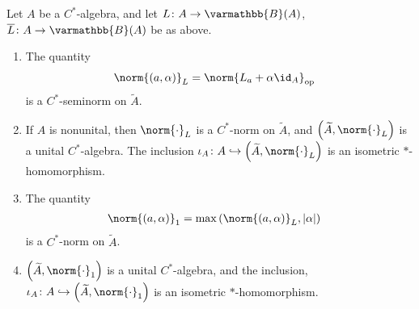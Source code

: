 \documentclass[10pt]{mypackage}
\renewcommand*{\mathbb}[1]{\varmathbb{#1}}
\newcommand{\B}{\mathbb{B}}
\DeclareMathOperator{\op}{op}
\begin{document}
\begin{proposition}
  Let $A$ be a $C^{\ast}$-algebra, and let $L\colon A\rightarrow \B(A)$, $\overline{L}\colon A\rightarrow \B(A)$ be as above. 
  \begin{enumerate}[(1)]
    \item The quantity
      \begin{align*}
        \norm{\left(a,\alpha\right)}_{L} &= \norm{L_a + \alpha \id_{A}}_{\op}
      \end{align*}
      is a $C^{\ast}$-seminorm on $\widetilde{A}$.
    \item If $A$ is nonunital, then $\norm{\cdot}_L$ is a $C^{\ast}$-norm on $\widetilde{A}$, and $\left(\widetilde{A},\norm{\cdot}_L\right)$ is a unital $C^{\ast}$-algebra. The inclusion $\iota_A\colon A\hookrightarrow \left(\widetilde{A},\norm{\cdot}_L\right)$ is an isometric $\ast$-homomorphism.
    \item The quantity
      \begin{align*}
        \norm{\left(a,\alpha\right)}_{1} &= \max\left(\norm{\left(a,\alpha\right)}_L,\left\vert \alpha \right\vert\right)
      \end{align*}
      is a $C^{\ast}$-norm on $\widetilde{A}$.
    \item $\left(\widetilde{A},\norm{\cdot}_1\right)$ is a unital $C^{\ast}$-algebra, and the inclusion, $\iota_A\colon A\hookrightarrow \left(\widetilde{A},\norm{\cdot}_1\right)$ is an isometric $\ast$-homomorphism.
  \end{enumerate}
\end{proposition}
\end{document}
